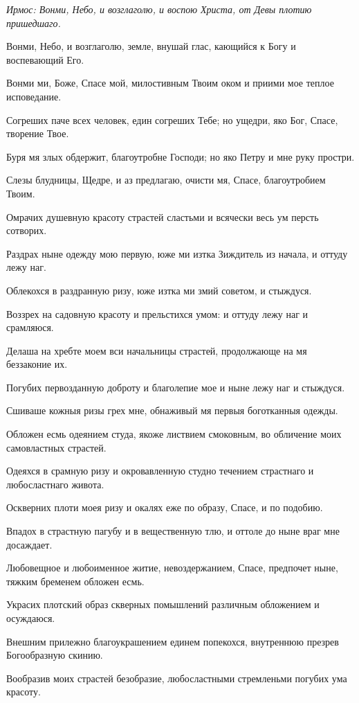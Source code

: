 

\itshape Ирмос\normalfont{}: Вонми, Небо, и возглаголю, и воспою Христа, от Девы плотию пришедшаго.


Вонми, Небо, и возглаголю, земле, внушай глас, кающийся к Богу и воспевающий Его.


Вонми ми, Боже, Спасе мой, милостивным Твоим оком и приими мое теплое исповедание.


Согреших паче всех человек, един согреших Тебе; но ущедри, яко Бог, Спасе, творение Твое.


Буря мя злых обдержит, благоутробне Господи; но яко Петру и мне руку простри.


Слезы блудницы, Щедре, и аз предлагаю, очисти мя, Спасе, благоутробием Твоим.


Омрачих душевную красоту страстей сластьми и всячески весь ум персть сотворих.


Раздрах ныне одежду мою первую, юже ми изтка Зиждитель из начала, и оттуду лежу наг.


Облекохся в раздранную ризу, юже изтка ми змий советом, и стыждуся.


Воззрех на садовную красоту и прельстихся умом: и оттуду лежу наг и срамляюся.


Делаша на хребте моем вси начальницы страстей, продолжающе на мя беззаконие их.


Погубих первозданную доброту и благолепие мое и ныне лежу наг и стыждуся.


Сшиваше кожныя ризы грех мне, обнаживый мя первыя боготканныя одежды.


Обложен есмь одеянием студа, якоже листвием смоковным, во обличение моих самовластных страстей.


Одеяхся в срамную ризу и окровавленную студно течением страстнаго и любосластнаго живота.


Оскверних плоти моея ризу и окалях еже по образу, Спасе, и по подобию.


Впадох в страстную пагубу и в вещественную тлю, и оттоле до ныне враг мне досаждает.


Любовещное и любоименное житие, невоздержанием, Спасе, предпочет ныне, тяжким бременем обложен есмь.


Украсих плотский образ скверных помышлений различным обложением и осуждаюся.


Внешним прилежно благоукрашением единем попекохся, внутреннюю презрев Богообразную скинию.


Вообразив моих страстей безобразие, любосластными стремленьми погубих ума красоту.


